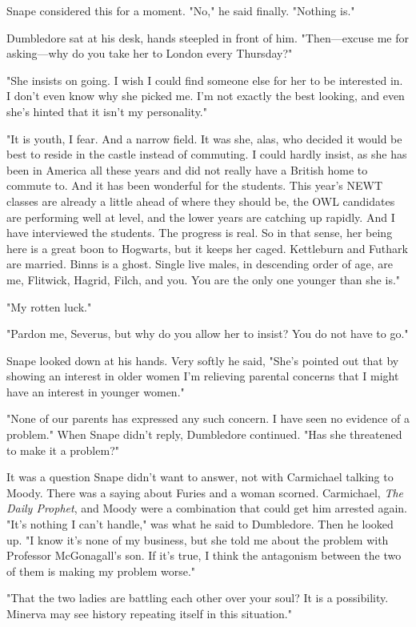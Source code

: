 Snape considered this for a moment. "No," he said finally. "Nothing is."

Dumbledore sat at his desk, hands steepled in front of him. "Then—excuse me for asking—why do you take her to London every Thursday?"

"She insists on going. I wish I could find someone else for her to be interested in. I don't even know why she picked me. I'm not exactly the best looking, and even she's hinted that it isn't my personality."

"It is youth, I fear. And a narrow field. It was she, alas, who decided it would be best to reside in the castle instead of commuting. I could hardly insist, as she has been in America all these years and did not really have a British home to commute to. And it has been wonderful for the students. This year's NEWT classes are already a little ahead of where they should be, the OWL candidates are performing well at level, and the lower years are catching up rapidly. And I have interviewed the students. The progress is real. So in that sense, her being here is a great boon to Hogwarts, but it keeps her caged. Kettleburn and Futhark are married. Binns is a ghost. Single live males, in descending order of age, are me, Flitwick, Hagrid, Filch, and you. You are the only one younger than she is."

"My rotten luck."

"Pardon me, Severus, but why do you allow her to insist? You do not have to go."

Snape looked down at his hands. Very softly he said, "She's pointed out that by showing an interest in older women I'm relieving parental concerns that I might have an interest in{\el} younger women."

"None of our parents has expressed any such concern. I have seen no evidence of a problem." When Snape didn't reply, Dumbledore continued. "Has she threatened to make it a problem?"

It was a question Snape didn't want to answer, not with Carmichael talking to Moody. There was a saying about Furies and a woman scorned. Carmichael, \emph{The Daily Prophet}, and Moody were a combination that could get him arrested again. "It's nothing I can't handle," was what he said to Dumbledore. Then he looked up. "I know it's none of my business, but she told me about the problem with Professor McGonagall's son. If it's true, I think the antagonism between the two of them is making my problem worse."

"That the two ladies are battling each other over your soul? It is a possibility. Minerva may see history repeating itself in this situation."

